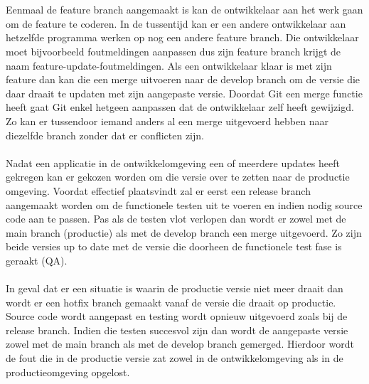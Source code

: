 \\ \\
Eenmaal de feature branch aangemaakt is kan de ontwikkelaar aan het werk gaan om de feature te coderen. In de tussentijd kan er een andere ontwikkelaar aan hetzelfde programma werken op nog een andere feature branch. Die ontwikkelaar moet bijvoorbeeld foutmeldingen aanpassen dus zijn feature branch krijgt de naam feature-update-foutmeldingen. Als een ontwikkelaar klaar is met zijn feature dan kan die een merge uitvoeren naar de develop branch om de versie die daar draait te updaten met zijn aangepaste versie. Doordat Git een merge functie heeft gaat Git enkel hetgeen aanpassen dat de ontwikkelaar zelf heeft gewijzigd. Zo kan er tussendoor iemand anders al een merge uitgevoerd hebben naar diezelfde branch zonder dat er conflicten zijn.
\\ \\
Nadat een applicatie in de ontwikkelomgeving een of meerdere updates heeft gekregen kan er gekozen worden om die versie over te zetten naar de productie omgeving. Voordat effectief plaatsvindt zal er eerst een release branch aangemaakt worden om de functionele testen uit te voeren en indien nodig source code aan te passen. Pas als de testen vlot verlopen dan wordt er zowel met de main branch (productie) als met de develop branch een merge uitgevoerd. Zo zijn beide versies up to date met de versie die doorheen de functionele test fase is geraakt (QA).
\\ \\
In geval dat er een situatie is waarin de productie versie niet meer draait dan wordt er een hotfix branch gemaakt vanaf de versie die draait op productie. Source code wordt aangepast en testing wordt opnieuw uitgevoerd zoals bij de release branch. Indien die testen succesvol zijn dan wordt de aangepaste versie zowel met de main branch als met de develop branch gemerged. Hierdoor wordt de fout die in de productie versie zat zowel in de ontwikkelomgeving als in de productieomgeving opgelost.
\\ \\